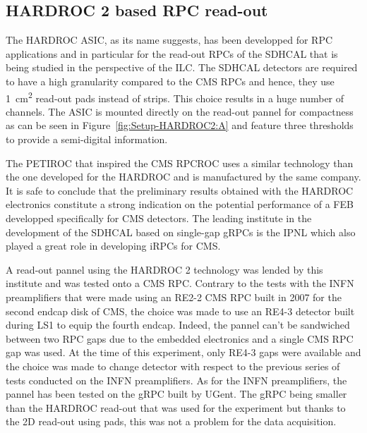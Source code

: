 	\subsection{HARDROC 2 based RPC read-out}
	\label{chapt6:ssec:HARDROC2}
	
	The \acf{HARDROC} ASIC, as its name suggests, has been developped for RPC applications and in particular for the read-out RPCs of the SDHCAL that is being studied in the perspective of the \acf{ILC}. The SDHCAL detectors are required to have a high granularity compared to the CMS RPCs and hence, they use \SI{1}{cm^2} read-out pads instead of strips. This choice results in a huge number of channels. The ASIC is mounted directly on the read-out pannel for compactness as can be seen in Figure~\ref{fig:Setup-HARDROC2:A} and feature three thresholds to provide a semi-digital information.
	
	The PETIROC that inspired the CMS RPCROC uses a similar technology than the one developed for the HARDROC and is manufactured by the same company. It is safe to conclude that the preliminary results obtained with the HARDROC electronics constitute a strong indication on the potential performance of a FEB developped specifically for CMS detectors. The leading institute in the development of the SDHCAL based on single-gap \acf{gRPCs} is the \acf{IPNL} which also played a great role in developing iRPCs for CMS.
	
	A read-out pannel using the HARDROC 2 technology was lended by this institute and was tested onto a CMS RPC. Contrary to the tests with the INFN preamplifiers that were made using an RE2-2 CMS RPC built in 2007 for the second endcap disk of CMS, the choice was made to use an RE4-3 detector built during LS1 to equip the fourth endcap. Indeed, the pannel can't be sandwiched between two RPC gaps due to the embedded electronics and a single CMS RPC gap was used. At the time of this experiment, only RE4-3 gaps were available and the choice was made to change detector with respect to the previous series of tests conducted on the INFN preamplifiers. As for the INFN preamplifiers, the pannel has been tested on the gRPC built by UGent. The gRPC being smaller than the HARDROC read-out that was used for the experiment but thanks to the 2D read-out using pads, this was not a problem for the data acquisition.
	 
